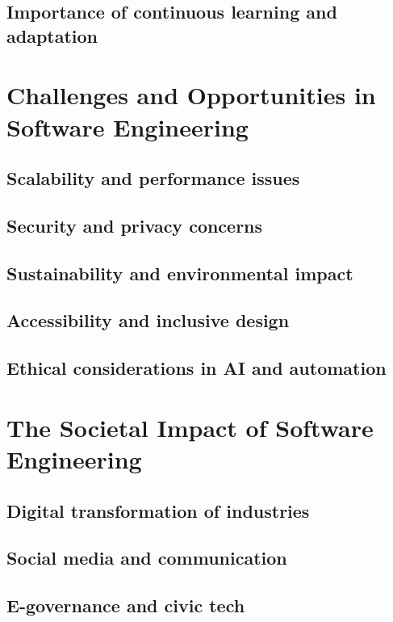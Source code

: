 \begin{refsection}
\begin{multicols}{2}
{\subsection{Importance of continuous learning and adaptation}

}
\newpage
\end{multicols}
\section{Challenges and Opportunities in Software Engineering}
\begin{multicols}{2}
{\small

\subsection{Scalability and performance issues}
\subsection{Security and privacy concerns}
\subsection{Sustainability and environmental impact}
\subsection{Accessibility and inclusive design}
\subsection{Ethical considerations in AI and automation}

}
\newpage
\end{multicols}
\section{The Societal Impact of Software Engineering}
\begin{multicols}{2}
{\small


\subsection{Digital transformation of industries}
\subsection{Social media and communication}
\subsection{E-governance and civic tech}
}
\end{multicols}
\end{refsection}
